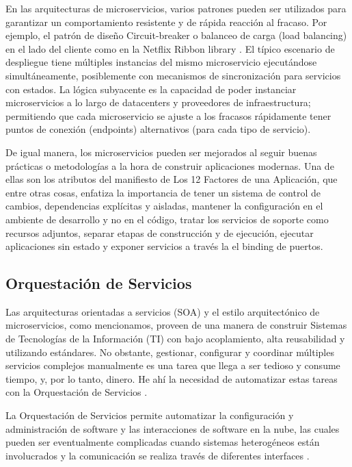         En las arquitecturas de microservicios, varios patrones pueden ser utilizados para garantizar un comportamiento resistente y de rápida reacción al fracaso. Por ejemplo, el patrón de diseño Circuit-breaker \cite{Nygard2007-ed} o balanceo de carga (load balancing) en el lado del cliente como en la Netflix Ribbon library \cite{Netflix2016-ri}. El típico escenario de despliegue tiene múltiples instancias del mismo microservicio ejecutándose simultáneamente, posiblemente con mecanismos de sincronización para servicios con estados. La lógica subyacente es la capacidad de poder instanciar microservicios a lo largo de datacenters y proveedores de infraestructura; permitiendo que cada microservicio se ajuste a los fracasos rápidamente tener puntos de conexión (endpoints) alternativos (para cada tipo de servicio).
        
        De igual manera, los microservicios pueden ser mejorados al seguir buenas prácticas o metodologías a la hora de construir aplicaciones modernas. Una de ellas son los atributos del manifiesto de Los 12 Factores de una Aplicación, que entre otras cosas, enfatiza la importancia de tener un sistema de control de cambios, dependencias explícitas y aisladas, mantener la configuración en el ambiente de desarrollo y no en el código, tratar los servicios de soporte como recursos adjuntos, separar etapas de construcción y de ejecución, ejecutar aplicaciones sin estado y exponer servicios a través la el binding de puertos.

        
    \subsection{Orquestación de Servicios}
        Las arquitecturas orientadas a servicios (SOA) y el estilo arquitectónico de microservicios, como mencionamos, proveen de una manera de construir Sistemas de Tecnologías de la Información (TI) con bajo acoplamiento, alta reusabilidad y utilizando estándares. No obstante, gestionar, configurar y coordinar múltiples servicios complejos manualmente es una tarea que llega a ser tedioso y consume tiempo, y, por lo tanto, dinero. He ahí la necesidad de automatizar estas tareas con la Orquestación de Servicios \cite{Kapuruge2014-qq}.
        
        La Orquestación de Servicios permite automatizar la configuración y administración de software y las interacciones de software en la nube, las cuales pueden ser eventualmente complicadas cuando sistemas heterogéneos están involucrados y la comunicación se realiza través de diferentes interfaces \citeyear{Katsaros2016-bj}. 
        
